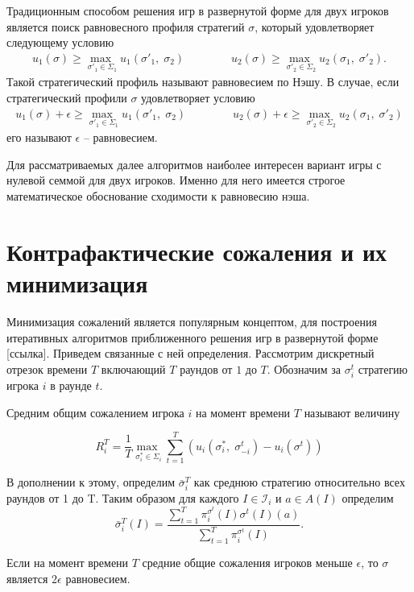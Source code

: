 Традиционным способом решения игр в развернутой форме для двух игроков является поиск равновесного профиля стратегий $\sigma$, который удовлетворяет следующему условию 
\begin{equation}
\begin{split}
	u_1(\sigma)\geq \underset{\sigma'_1\in \Sigma_1}{\max\;} u_1(\sigma'_1,\;\sigma_2) & \;\;\;\;\;\;\;\;\;\;\;\; u_2(\sigma)\geq \underset{\sigma'_2\in \Sigma_2}{\max\;} u_2(\sigma_1,\;\sigma'_2).
\end{split}
\end{equation} 
Такой стратегический профиль называют равновесием по Нэшу. В случае, если стратегический профили $\sigma$ удовлетворяет условию 
\begin{equation}
	\begin{split}
		u_1(\sigma)+\epsilon\geq \underset{\sigma'_1\in \Sigma_1}{\max\;} u_1(\sigma'_1,\;\sigma_2) & \;\;\;\;\;\;\;\;\;\;\;\; u_2(\sigma)+\epsilon\geq \underset{\sigma'_2\in \Sigma_2}{\max\;} u_2(\sigma_1,\;\sigma'_2)
	\end{split}
\end{equation}
его называют $\epsilon$ – равновесием.
\par
Для рассматриваемых далее алгоритмов наиболее интересен вариант игры с нулевой семмой для двух игроков. Именно для него имеется строгое математическое обоснование сходимости к равновесию нэша.

\section{Контрафактические сожаления и их минимизация}

Минимизация сожалений является популярным концептом, для построения итеративных алгоритмов приближенного решения игр в развернутой форме [ссылка]. Приведем связанные с ней определения. Рассмотрим дискретный отрезок времени $T$ включающий $T$ раундов от $1$ до $T$. Обозначим за $\sigma_i^t$ стратегию игрока $i$ в раунде $t$. 
\begin{defin}
	Средним общим сожалением игрока $i$ на момент времени $T$ называют величину 
\end{defin}
\begin{equation}
	R_i^T=\frac{1}{T} \underset{\sigma_i^*\in \Sigma_i}{\max\;}\sum_{t=1}^{T}(u_i(\sigma_i^* ,\;\sigma_{-i}^t)-u_i(\sigma^t))
\end{equation} 

В дополнении к этому, определим $\bar{\sigma}_i^T$ как среднюю стратегию относительно всех раундов от 1 до T. Таким образом для каждого $I \in \mathcal{I}_i$ и $a\in A(I)$ определим 
\begin{equation}
	\bar{\sigma}_i^T(I)=\frac{\sum^T_{t=1}\pi_i^{\sigma^t}(I)\sigma^t(I)(a)}{\sum_{t=1}^{T}\pi_i^{\sigma^t}(I)}.
\end{equation}
\begin{theo} Если на момент времени $T$ средние общие сожаления игроков меньше $\epsilon$, то $\sigma$ является $2\epsilon$ равновесием. 
\end{theo}

